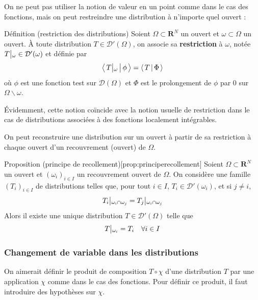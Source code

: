         On ne peut pas utiliser la notion de valeur en un point comme dans le cas des fonctions, mais on peut restreindre une distribution à n’importe quel ouvert :

        \begin{omed}{Définition (restriction des distributions)}
            Soient $\Omega \subset \mathbf{R}^N$ un ouvert et $\omega \subset \Omega$ un ouvert. À toute distribution $T \in \mathcal{D}'(\Omega)$, on associe sa \textbf{restriction} à $\omega$, notée $T \big|\vphantom{|}_{\omega} \in \mathcal{D}'(\omega)$ et définie par 
            \[ \left< \, T \big|\vphantom{|}_{\omega} \, \middle| \, \phi \, \right> = \left< \, T \, \middle| \, \Phi \, \right> \]   
            où $\phi$ est une fonction test sur $\mathcal{D}(\Omega)$ et $\Phi$ est le prolongement de $\phi$ par $0$ sur $\Omega \backslash \omega$.
        \end{omed}

        Évidemment, cette notion coïncide avec la notion usuelle de restriction dans le cas de distributions associées à des fonctions localement intégrables.

        On peut reconstruire une distribution sur un ouvert à partir de sa restriction à chaque ouvert d’un recouvrement (ouvert) de $\Omega$.

        \begin{omed}{Proposition (principe de recollement)}[prop:principerecollement]
            Soient $\Omega \subset \mathbf{R}^N$ un ouvert et $(\omega_i)_{i \in I}$ un recouvrement ouvert de $\Omega$. On considère une famille $(T_i)_{i \in I}$ de distributions telles que, pour tout $i \in I$, $T_i \in \mathcal{D}'(\omega_i)$, et si $j \neq i$, 
            \[ T_i \big|\vphantom{|}_{\omega_i \cap \omega_j} = T_j \big|\vphantom{|}_{\omega_i \cap \omega_j} \] 
            Alors il existe une unique distribution $T \in \mathcal{D}'(\Omega)$ telle que 
            \[ T \big|\vphantom{|}_{\omega_i} = T_i \quad \forall i \in I \]
        \end{omed}

        \subsubsection{Changement de variable dans les distributions}

        On aimerait définir le produit de composition $T \circ \chi$ d’une distribution $T$ par une application $\chi$ comme dans le cas des fonctions. Pour définir ce produit, il faut introduire des hypothèses sur $\chi$.


